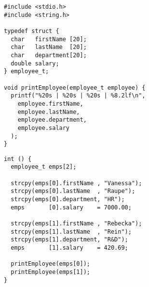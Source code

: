 \begin{frame}[fragile]
%
\begin{tcbraster}[raster columns=2,
                  raster equal height,
                  nobeforeafter
                 ]
\begin{codebox}
\begin{verbatim}
#include <stdio.h>
#include <string.h>

typedef struct {
  char   firstName [20];
  char   lastName  [20];
  char   department[20];
  double salary;
} employee_t;

void printEmployee(employee_t employee) {
  printf("%20s | %20s | %20s | %8.2lf\n",
    employee.firstName,
    employee.lastName,
    employee.department,
    employee.salary
  );
}
\end{verbatim}
\end{codebox}
%
\begin{codebox}[...Fortsetzung]
\begin{verbatim}
int () {
  employee_t emps[2];
  
  strcpy(emps[0].firstName , "Vanessa");
  strcpy(emps[0].lastName  , "Raupe");
  strcpy(emps[0].department, "HR");
  emps       [0].salary    = 7000.00;
  
  strcpy(emps[1].firstName , "Rebecka");
  strcpy(emps[1].lastName  , "Rein");
  strcpy(emps[1].department, "R&D");
  emps       [1].salary    = 420.69;
  
  printEmployee(emps[0]);
  printEmployee(emps[1]);
}
\end{verbatim}
\end{codebox}
\end{tcbraster}
%
\end{frame}



